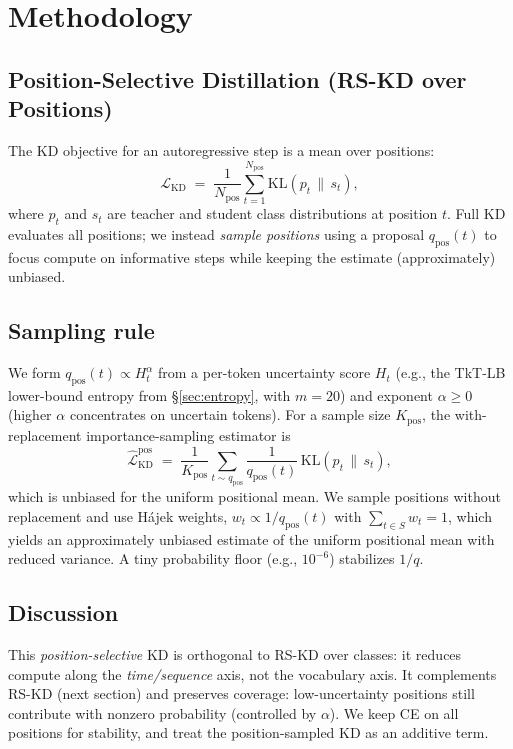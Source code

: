 \documentclass[11pt]{article}
\begin{document}
\section{Methodology}

\subsection{Position-Selective Distillation (RS-KD over Positions)}
\label{sec:posrs}

The KD objective for an autoregressive step is a mean over positions:
\[
	\mathcal{L}_{\text{KD}} \;=\; \frac{1}{N_{\text{pos}}} \sum_{t=1}^{N_{\text{pos}}}
	\mathrm{KL}\!\left(p_t \,\|\, s_t\right),
\]
where $p_t$ and $s_t$ are teacher and student class distributions at position $t$.
Full KD evaluates all positions; we instead \emph{sample positions} using a proposal
$q_{\text{pos}}(t)$ to focus compute on informative steps while keeping the estimate (approximately) unbiased.

\subsection{Sampling rule}
We form $q_{\text{pos}}(t) \propto H_t^\alpha$ from a per-token uncertainty score $H_t$
(e.g., the TkT-LB lower-bound entropy from \S\ref{sec:entropy}, with $m{=}20$) and exponent $\alpha\!\ge\!0$ (higher $\alpha$ concentrates on uncertain tokens). For a sample size $K_{\text{pos}}$, the with-replacement importance-sampling estimator is
\[
	\widehat{\mathcal{L}}_{\text{KD}}^{\text{pos}} \;=\;
	\frac{1}{K_{\text{pos}}} \sum_{t \sim q_{\text{pos}}}
	\frac{1}{q_{\text{pos}}(t)} \,\mathrm{KL}\!\left(p_t \,\|\, s_t\right),
\]
which is unbiased for the uniform positional mean. We sample positions without replacement and use Hájek weights, $w_t \propto 1/q_{\text{pos}}(t)$ with $\sum_{t\in S} w_t = 1$, which yields an approximately unbiased estimate of the uniform positional mean with reduced variance.
A tiny probability floor (e.g., $10^{-6}$) stabilizes $1/q$.

\subsection{Discussion}
This \emph{position-selective} KD is orthogonal to RS-KD over classes: it reduces compute along the \emph{time/sequence} axis, not the vocabulary axis. It complements RS-KD (next section) and preserves coverage: low-uncertainty positions still contribute with nonzero probability (controlled by $\alpha$).
We keep CE on all positions for stability, and treat the position-sampled KD as an additive term.
\end{document}

